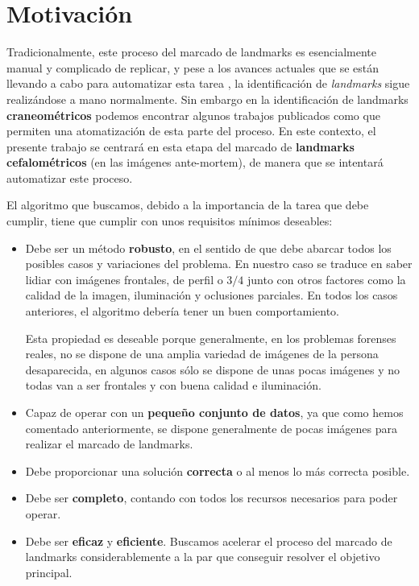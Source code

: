 \medskip 


\section{Motivación}

Tradicionalmente, este proceso del marcado de landmarks es esencialmente manual y complicado de replicar, y pese a los avances actuales que se están llevando a cabo para automatizar esta tarea \cite{Huete2015PastPA}, la identificación de \textit{landmarks} sigue realizándose a mano normalmente. Sin embargo en la identificación de landmarks \textbf{craneométricos} podemos encontrar algunos trabajos publicados como \cite{bermejo2021automatic} que permiten una atomatización de esta parte del proceso. En este contexto, el presente trabajo se centrará en esta etapa del marcado de \textbf{landmarks cefalométricos} (en las imágenes ante-mortem), de manera que se intentará automatizar este proceso.

\medskip

\noindent El algoritmo que buscamos, debido a la importancia de la tarea que debe cumplir, tiene que cumplir con unos requisitos mínimos deseables: 

\begin{itemize}
    \item Debe ser un método \textbf{robusto}, en el sentido de que debe abarcar todos los posibles casos y variaciones del problema. En nuestro caso se traduce en saber lidiar con imágenes frontales, de perfil o $3/4$ junto con otros factores como la calidad de la imagen, iluminación y oclusiones parciales. En todos los casos anteriores, el algoritmo debería tener un buen comportamiento.
    
    \medskip

    \noindent Esta propiedad es deseable porque generalmente, en los problemas forenses reales, no se dispone de una amplia variedad de imágenes de la persona desaparecida, en algunos casos sólo se dispone de unas pocas imágenes y no todas van a ser frontales y con buena calidad e iluminación.

    \item Capaz de operar con un \textbf{pequeño conjunto de datos}, ya que como hemos comentado anteriormente, se dispone generalmente de pocas imágenes para realizar el marcado de landmarks.
    \item Debe proporcionar una solución \textbf{correcta} o al menos lo más correcta posible.  
    \item Debe ser \textbf{completo}, contando con todos los recursos necesarios para poder operar.
    \item Debe ser \textbf{eficaz} y \textbf{eficiente}. Buscamos acelerar el proceso del marcado de landmarks considerablemente a la par que conseguir resolver el objetivo principal.
\end{itemize}

